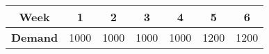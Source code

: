 \begin{tabular}{|c|c|c|c|c|c|c|}
        \hline
        \textbf{Week} & 1 & 2 & 3 & 4 & 5 & 6 \\
        \hline
        \textbf{Demand} & 1000 & 1000 & 1000 & 1000 & 1200 & 1200 \\
        \hline
        \end{tabular}
